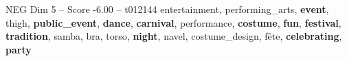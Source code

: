 \begin{textsample}{NEG Dim 5 – Score -6.00 – t012144}  \label{ex:f5_neg_021}
entertainment, performing\_arts, \textbf{event}, thigh, \textbf{public\_event}, \textbf{dance}, \textbf{carnival}, performance, \textbf{costume}, \textbf{fun}, \textbf{festival}, \textbf{tradition}, samba, bra, torso, \textbf{night}, navel, costume\_design, fête, \textbf{celebrating}, \textbf{party}

\end{textsample}

